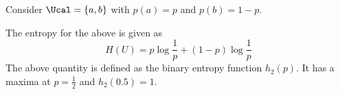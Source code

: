\begin{eg}
Consider $\Ucal = \{a,b\}$ with $p(a) =p$ and $p(b) = 1-p$. 

\noindent
\begin{minipage}{0.6\textwidth}
The entropy for the above is given as
\[H(U) = p\log\frac{1}{p} + (1-p)\log\frac{1}{p}\]
The above quantity is defined as the binary entropy function $h_2(p)$. It has a maxima at $p=\frac{1}{2}$ and $h_2(0.5) = 1$.
\end{minipage}
\hspace{0.1\textwidth}
\begin{minipage}{0.3\textwidth}
\end{minipage}
\end{eg}
